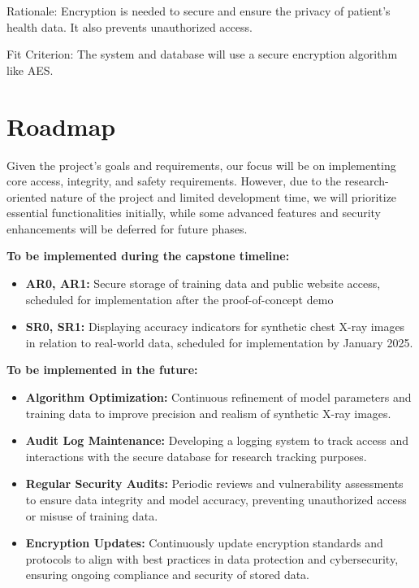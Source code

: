 \documentclass{article}
\begin{document}
Rationale: Encryption is needed to secure and ensure the privacy of patient's health data. It also
prevents unauthorized access.

Fit Criterion: The system and database will use a secure encryption algorithm like AES.

\section{Roadmap}

Given the project's goals and requirements, our focus will be on implementing core access,
integrity, and safety requirements. However, due to the research-oriented nature of the project
and limited development time, we will prioritize essential functionalities initially, while some
advanced features and security enhancements will be deferred for future phases.

\textbf{To be implemented during the capstone timeline:}
\begin{itemize}
  \item \textbf{AR0, AR1:} Secure storage of training data and public website access, scheduled for
    implementation after the proof-of-concept demo
  \item \textbf{SR0, SR1:} Displaying accuracy indicators for synthetic chest X-ray images in
    relation to real-world data, scheduled for implementation by January 2025.
\end{itemize}

\textbf{To be implemented in the future:}
\begin{itemize}
  \item \textbf{Algorithm Optimization:} Continuous refinement of model parameters and training
    data to improve precision and realism of synthetic X-ray images.
  \item \textbf{Audit Log Maintenance:} Developing a logging system to track access and
    interactions with the secure database for research tracking purposes.
  \item \textbf{Regular Security Audits:} Periodic reviews and vulnerability assessments to ensure
    data integrity and model accuracy, preventing unauthorized access or misuse of training data.
  \item \textbf{Encryption Updates:} Continuously update encryption standards and protocols to
    align with best practices in data protection and cybersecurity, ensuring ongoing compliance and
    security of stored data.
\end{itemize}
\end{document}
